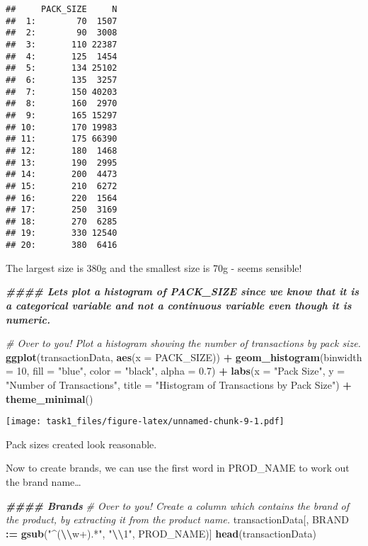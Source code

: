 \documentclass[
]{article}
\newenvironment{Shaded}{\begin{snugshade}}{\end{snugshade}}
\newcommand{\AttributeTok}[1]{\textcolor[rgb]{0.13,0.29,0.53}{#1}}
\newcommand{\CommentTok}[1]{\textcolor[rgb]{0.56,0.35,0.01}{\textit{#1}}}
\newcommand{\DecValTok}[1]{\textcolor[rgb]{0.00,0.00,0.81}{#1}}
\newcommand{\DocumentationTok}[1]{\textcolor[rgb]{0.56,0.35,0.01}{\textbf{\textit{#1}}}}
\newcommand{\FloatTok}[1]{\textcolor[rgb]{0.00,0.00,0.81}{#1}}
\newcommand{\FunctionTok}[1]{\textcolor[rgb]{0.13,0.29,0.53}{\textbf{#1}}}
\newcommand{\NormalTok}[1]{#1}
\newcommand{\SpecialCharTok}[1]{\textcolor[rgb]{0.81,0.36,0.00}{\textbf{#1}}}
\newcommand{\StringTok}[1]{\textcolor[rgb]{0.31,0.60,0.02}{#1}}
\begin{document}
\begin{verbatim}
##     PACK_SIZE     N
##  1:        70  1507
##  2:        90  3008
##  3:       110 22387
##  4:       125  1454
##  5:       134 25102
##  6:       135  3257
##  7:       150 40203
##  8:       160  2970
##  9:       165 15297
## 10:       170 19983
## 11:       175 66390
## 12:       180  1468
## 13:       190  2995
## 14:       200  4473
## 15:       210  6272
## 16:       220  1564
## 17:       250  3169
## 18:       270  6285
## 19:       330 12540
## 20:       380  6416
\end{verbatim}

The largest size is 380g and the smallest size is 70g - seems sensible!

\begin{Shaded}
\begin{Highlighting}[]
\DocumentationTok{\#\#\#\# Let\textquotesingle{}s plot a histogram of PACK\_SIZE since we know that it is a categorical variable and not a continuous variable even though it is numeric.}

\CommentTok{\# Over to you! Plot a histogram showing the number of transactions by pack size.}
\FunctionTok{ggplot}\NormalTok{(transactionData, }\FunctionTok{aes}\NormalTok{(}\AttributeTok{x =}\NormalTok{ PACK\_SIZE)) }\SpecialCharTok{+}
  \FunctionTok{geom\_histogram}\NormalTok{(}\AttributeTok{binwidth =} \DecValTok{10}\NormalTok{, }\AttributeTok{fill =} \StringTok{"blue"}\NormalTok{, }\AttributeTok{color =} \StringTok{"black"}\NormalTok{, }\AttributeTok{alpha =} \FloatTok{0.7}\NormalTok{) }\SpecialCharTok{+}
  \FunctionTok{labs}\NormalTok{(}\AttributeTok{x =} \StringTok{"Pack Size"}\NormalTok{, }\AttributeTok{y =} \StringTok{"Number of Transactions"}\NormalTok{, }\AttributeTok{title =} \StringTok{"Histogram of Transactions by Pack Size"}\NormalTok{) }\SpecialCharTok{+}
  \FunctionTok{theme\_minimal}\NormalTok{()}
\end{Highlighting}
\end{Shaded}

\texttt{[image: task1\_files/figure-latex/unnamed-chunk-9-1.pdf]}

Pack sizes created look reasonable.

Now to create brands, we can use the first word in PROD\_NAME to work
out the brand name\ldots{}

\begin{Shaded}
\begin{Highlighting}[]
\DocumentationTok{\#\#\#\# Brands}
\CommentTok{\# Over to you! Create a column which contains the brand of the product, by extracting it from the product name.}
\NormalTok{transactionData[, BRAND }\SpecialCharTok{:=} \FunctionTok{gsub}\NormalTok{(}\StringTok{"\^{}(}\SpecialCharTok{\textbackslash{}\textbackslash{}}\StringTok{w+).*"}\NormalTok{, }\StringTok{"}\SpecialCharTok{\textbackslash{}\textbackslash{}}\StringTok{1"}\NormalTok{, PROD\_NAME)]}
\FunctionTok{head}\NormalTok{(transactionData)}
\end{Highlighting}
\end{Shaded}
\end{document}
